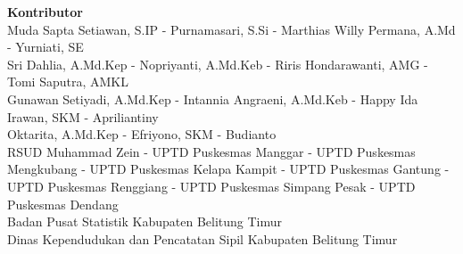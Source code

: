 {\begin{raggedright}
\textbf{Kontributor}\\
\smallskip
Muda Sapta Setiawan, S.IP - Purnamasari, S.Si - Marthias Willy Permana, A.Md - Yurniati, SE\\
\smallskip
Sri Dahlia, A.Md.Kep - Nopriyanti, A.Md.Keb - Riris Hondarawanti, AMG - Tomi Saputra, AMKL \\
\smallskip
Gunawan Setiyadi, A.Md.Kep - Intannia Angraeni, A.Md.Keb - Happy Ida Irawan, SKM - Apriliantiny\\
\smallskip
Oktarita, A.Md.Kep - Efriyono, SKM - Budianto\\
\smallskip
RSUD Muhammad Zein - UPTD Puskesmas Manggar - UPTD Puskesmas Mengkubang
- UPTD Puskesmas Kelapa Kampit - UPTD Puskesmas Gantung - UPTD Puskesmas
Renggiang - UPTD Puskesmas Simpang Pesak - UPTD Puskesmas Dendang \\
\smallskip
Badan Pusat Statistik Kabupaten Belitung Timur\\
\smallskip
Dinas Kependudukan dan Pencatatan Sipil Kabupaten Belitung Timur
\end{raggedright}

}